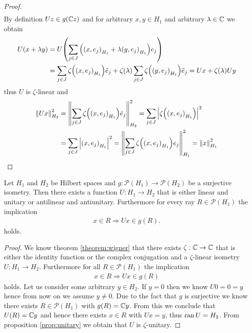 \begin{proof}
\begin{align*}
	\end{align*}
	By definition $Uz \in g(\C z)$ and for arbitrary $x,y \in H_1$ and arbitrary $\lambda \in \C$ we obtain
	\begin{align*}
		U(x + \lambda y) &= U \pbraces{\sum_{j \in J} \pbraces{\pbraces{x, e_j}_{H_1} + \lambda \pbraces{y, e_j}_{H_1}} e_j} \\
		&= \sum_{j \in J} \zeta\pbraces{\pbraces{x, e_j}_{H_1}} \tilde{e}_j + \zeta(\lambda) \sum_{j \in J} \zeta\pbraces{\pbraces{y, e_j}_{H_1}} \tilde{e}_j = Ux + \zeta\pbraces{\lambda} Uy
	\end{align*}
	thus $U$ is $\zeta$-linear and 
	\begin{align*}
		\norm[H_2]{Ux}^2 &= \norm[H_2]{\sum_{j \in J} \zeta\pbraces{\pbraces{x, e_j}_{H_1}} \tilde{e}_j}^2 = \sum_{j \in J} \vbraces{\zeta\pbraces{\pbraces{x, e_j}_{H_1}}}^2  \\
		&= \sum_{j \in J} \vbraces{\pbraces{x, e_j}_{H_1}}^2 = \norm[H_1]{\sum_{j \in J} \zeta\pbraces{\pbraces{x, e_j}_{H_1}} e_j}^2 = \norm[H_1]{x}^2
	\end{align*}
\end{proof}


\begin{corollary}
	Let $H_1$ and $H_2$ be Hilbert spaces and $g: \mathcal{P}(H_1) \to \mathcal{P}(H_2)$ be a surjective isometry. Then there exists a function $U: H_1 \to H_2$ that is either linear and unitary or antilinear and antiunitary. Furthermore for every ray $R \in \mathcal{P}(H_1)$ the implication
	\begin{align*}
	x \in R \Rightarrow Ux \in g(R).
	\end{align*}
	holds.
\end{corollary}

\begin{proof}
	We know theorem \ref{theorem:wigner} that there exists $\zeta: \C \to \C$ that is either the identity function or the complex conjugation and a $\zeta$-linear isometry $U: H_1 \to H_2$. Furthermore for all $R \in \mathcal{P}(H_1)$ the implication
	\begin{align*}
		x \in R \Rightarrow Ux \in g(R)
	\end{align*}
	holds. Let us consider some arbitrary $y \in H_2$. If $y = 0$ then we know $U0 = 0 = y$ hence from now on we assume $y \neq 0$. Due to the fact that $g$ is surjective we know there exists $R \in \mathcal{P}(H_1)$ with $g(R) = \C y$. From this we conclude that $U(R) = \C y$ and hence there exists $x \in R$ with $Ux = y$, thus $\ran U = H_2$. From proposition \ref{prop:unitary} we obtain that $U$ is $\zeta$-unitary.
\end{proof}